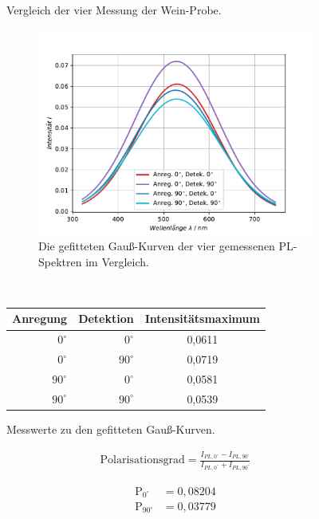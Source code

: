 \begin{figure}[hbtp]
\centering
\caption{Vergleich der vier Messung der Wein-Probe.}
	\begin{subfigure}{0.45\textwidth}
	\includegraphics[width=\textwidth]{Plots/aufgabe3_vergleich.pdf}
	\caption{Die gefitteten Gau{\ss}-Kurven der vier gemessenen PL-Spektren im Vergleich.}
	\label{abb:auf3_vergleich}
	\end{subfigure}
	~
	\begin{subtable}{0.45\textwidth}
	\caption{Messwerte zu den gefitteten Gau{\ss}-Kurven.}
	\begin{tabular}{|rrc|}
	\hline
	{Anregung} & {Detektion} & {Intensit\"{a}tsmaximum} \\
	\hline
	$0^{\circ}$ & $0^{\circ}$ & 0,0611 \\
	$0^{\circ}$ & $90^{\circ}$ & 0,0719 \\
	$90^{\circ}$ & $0^{\circ}$ & 0,0581 \\
	$90^{\circ}$ & $90^{\circ}$ & 0,0539 \\
	\hline
	\end{tabular}
	\end{subtable}
\label{auf3}
\end{figure}


\begin{align}
	\text{Polarisationsgrad} = \frac{I_{PL,0^{\circ}} - I_{PL,90^{\circ}}}{I_{PL,0^{\circ}} + I_{PL,90^{\circ}}}
\end{align}

\begin{align*}
	\text{P}_{0^{\circ}} &= 0,08204 \\
	\text{P}_{90^{\circ}} &= 0,03779 \\	
\end{align*}